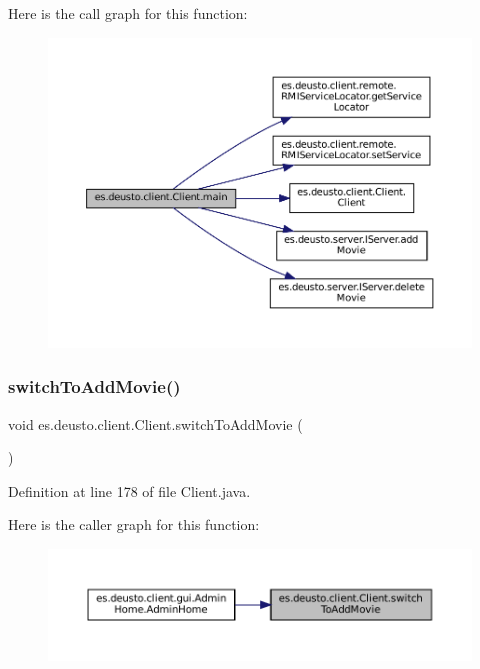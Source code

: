 Here is the call graph for this function\+:\nopagebreak
\begin{figure}[H]
\begin{center}
\leavevmode
\includegraphics[width=350pt]{classes_1_1deusto_1_1client_1_1_client_a69a7526d0af9cb2341f4bf341b501152_cgraph}
\end{center}
\end{figure}
\mbox{\label{classes_1_1deusto_1_1client_1_1_client_ab9f0c684bccefc286261f8af7366b959}} 
\subsubsection{\texorpdfstring{switchToAddMovie()}{switchToAddMovie()}}
{\footnotesize\ttfamily void es.\+deusto.\+client.\+Client.\+switch\+To\+Add\+Movie (\begin{DoxyParamCaption}{ }\end{DoxyParamCaption})}



Definition at line 178 of file Client.\+java.

Here is the caller graph for this function\+:
\nopagebreak
\begin{figure}[H]
\begin{center}
\leavevmode
\includegraphics[width=350pt]{classes_1_1deusto_1_1client_1_1_client_ab9f0c684bccefc286261f8af7366b959_icgraph}
\end{center}
\end{figure}
\mbox{\label{classes_1_1deusto_1_1client_1_1_client_a3fbd67bddee7a6c6ed8466ed5b2415a7}} 
